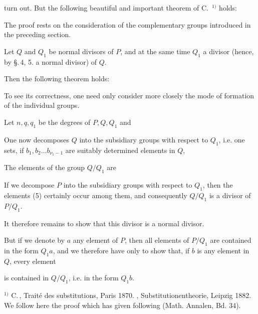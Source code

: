 turn out. But the following beautiful and important theorem
of C.\, $^{1)}$ holds:


The proof rests on the consideration of the complementary
groups introduced in the preceding section.

Let $Q$ and $Q_1$ be normal divisors of $P$, and at the same time $Q_1$
a divisor (hence, by \S.\,4, 5. a normal divisor) of $Q$.

Then the following theorem holds:


To see its correctness, one need only consider more
closely the mode of formation of the individual groups.

Let $n, q, q_1$ be the degrees of $P, Q, Q_1$ and


One now decomposes $Q$ into the subsidiary groups with respect to $Q_1$, i.e. one
sets, if $b_1, b_2 \ldots b_{\nu_1 - 1}$ are suitably determined elements in $Q$,


The elements of the group $Q/Q_1$ are


If we decompose $P$ into the subsidiary groups with respect to $Q_1$, then
the elements (5) certainly occur among them, and consequently $Q/Q_1$
is a divisor of $P/Q_1$.

It therefore remains to show that this divisor is a
normal divisor.

But if we denote by $a$ any element of $P$, then
all elements of $P/Q_1$ are contained in the form $Q_1 a$, and
we therefore have only to show that, if $b$ is any element
in $Q$, every element


is contained in $Q/Q_1$, i.e. in the form $Q_1 b$.

$^{1)}$ C.\,, Traité des substitutions, Paris 1870. , Substitutionentheorie,
Leipzig 1882. We follow here the proof which
 has given following  (Math. Annalen, Bd. 34).
